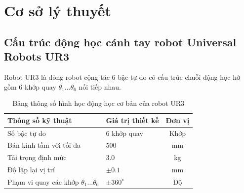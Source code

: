\documentclass[a4paper,12pt]{article}
\begin{document}
\section{Cơ sở lý thuyết}

\subsection{Cấu trúc động học cánh tay robot Universal Robots UR3}
Robot UR3 là dòng robot cộng tác 6 bậc tự do có cấu trúc chuỗi động học hở gồm 6 khớp quay $\theta_1 \dots \theta_6$ nối tiếp nhau.

\begin{table}[H]
\centering
\renewcommand{\arraystretch}{1.2}
\caption{Bảng thông số hình học động học cơ bản của robot UR3}
\label{tab:ur3_specs}
\begin{tabular}{llc}
\toprule
\textbf{Thông số kỹ thuật} & \textbf{Giá trị thiết kế} & \textbf{Đơn vị} \\
\midrule
Số bậc tự do & 6 khớp quay & Khớp \\
Bán kính tầm với tối đa & 500 & mm \\
Tải trọng định mức & 3.0 & kg \\
Độ lặp lại vị trí & $\pm 0.1$ & mm \\
Phạm vi quay các khớp $\theta_1 \dots \theta_6$ & $\pm 360^\circ$ & Độ \\
\bottomrule
\end{tabular}
\end{table}
\end{document}
